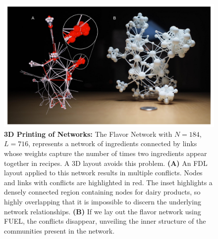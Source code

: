 \documentclass[linenumbers,endfloats,nofootinbib,preprint,floatfix,titlepage,superscriptaddress]{revtex4-1} %
\begin{document}
\begin{figure}
    \centering
    \includegraphics[width=\textwidth]{fig-09-19/3D-flavor-112117-1.pdf}
    \caption{\scriptsize {\bf 3D Printing of Networks:}
    The Flavor Network with $N=184$, $L=716$, represents a network of ingredients connected by links whose weights capture the number of times two ingredients appear together in recipes. 
    A 3D layout avoids this problem. 
    {\bf (A)} An FDL layout applied to this network results in multiple conflicts.
    Nodes and links with conflicts are highlighted in red. 
    The inset highlights a densely connected region containing nodes for dairy products,
    so highly overlapping that it is impossible to discern the underlying network relationships.
    {\bf (B)} If we lay out the flavor network using FUEL, the conflicts disappear, 
    unveiling the inner structure of the communities \cite{fortunato2010community}
    present in the network. 
}
\end{figure}
\end{document}
